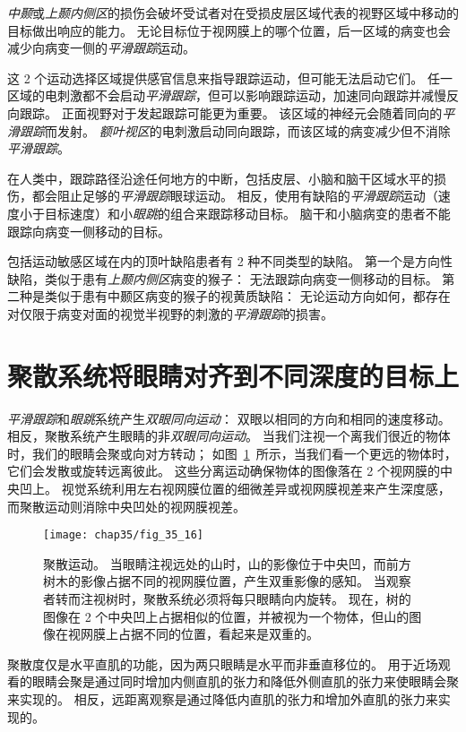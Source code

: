 \textit{中颞}或\textit{上颞内侧区}的损伤会破坏受试者对在受损皮层区域代表的视野区域中移动的目标做出响应的能力。
无论目标位于视网膜上的哪个位置，后一区域的病变也会减少向病变一侧的\textit{平滑跟踪}运动。


这 2 个运动选择区域提供感官信息来指导跟踪运动，但可能无法启动它们。
任一区域的电刺激都不会启动\textit{平滑跟踪}，但可以影响跟踪运动，加速同向跟踪并减慢反向跟踪。
正面视野对于发起跟踪可能更为重要。
该区域的神经元会随着同向的\textit{平滑跟踪}而发射。
\textit{额叶视区}的电刺激启动同向跟踪，而该区域的病变减少但不消除\textit{平滑跟踪}。


在人类中，跟踪路径沿途任何地方的中断，包括皮层、小脑和脑干区域水平的损伤，都会阻止足够的\textit{平滑跟踪}眼球运动。
相反，使用有缺陷的\textit{平滑跟踪}运动（速度小于目标速度）和小\textit{眼跳}的组合来跟踪移动目标。
脑干和小脑病变的患者不能跟踪向病变一侧移动的目标。


包括运动敏感区域在内的顶叶缺陷患者有 2 种不同类型的缺陷。
第一个是方向性缺陷，类似于患有\textit{上颞内侧区}病变的猴子：
无法跟踪向病变一侧移动的目标。
第二种是类似于患有中颞区病变的猴子的视黄质缺陷：
无论运动方向如何，都存在对仅限于病变对面的视觉半视野的刺激的\textit{平滑跟踪}的损害。



\section{聚散系统将眼睛对齐到不同深度的目标上}

\textit{平滑跟踪}和\textit{眼跳}系统产生\textit{双眼同向运动}：
双眼以相同的方向和相同的速度移动。
相反，聚散系统产生眼睛的非\textit{双眼同向运动}。
当我们注视一个离我们很近的物体时，我们的眼睛会聚或向对方转动；
如图~\ref{fig:35_16}~所示，当我们看一个更远的物体时，它们会发散或旋转远离彼此。
这些分离运动确保物体的图像落在 2 个视网膜的中央凹上。
视觉系统利用左右视网膜位置的细微差异或视网膜视差来产生深度感，而聚散运动则消除中央凹处的视网膜视差。


\begin{figure}[htbp]
	\centering
	\texttt{[image: chap35/fig\_35\_16]}
	\caption{聚散运动。
		当眼睛注视远处的山时，山的影像位于中央凹，而前方树木的影像占据不同的视网膜位置，产生双重影像的感知。
		当观察者转而注视树时，聚散系统必须将每只眼睛向内旋转。
		现在，树的图像在 2 个中央凹上占据相似的位置，并被视为一个物体，但山的图像在视网膜上占据不同的位置，看起来是双重的。}
	\label{fig:35_16}
\end{figure}


聚散度仅是水平直肌的功能，因为两只眼睛是水平而非垂直移位的。
用于近场观看的眼睛会聚是通过同时增加内侧直肌的张力和降低外侧直肌的张力来使眼睛会聚来实现的。
相反，远距离观察是通过降低内直肌的张力和增加外直肌的张力来实现的。


